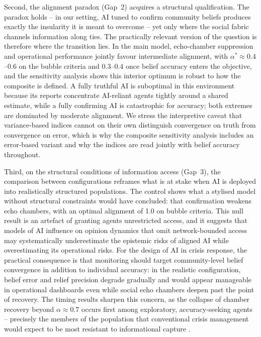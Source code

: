 \documentclass[pdflatex,sn-basic]{sn-jnl}
\begin{document}
Second, the alignment paradox (Gap~2) \citep{west2025alignment} acquires a structural qualification. The paradox holds -- in our setting, AI tuned to confirm community beliefs produces exactly the insularity it is meant to overcome -- yet only where the social fabric channels information along ties. The practically relevant version of the question is therefore where the transition lies. In the main model, echo-chamber suppression and operational performance jointly favour intermediate alignment, with $\alpha^{*} \approx 0.4$--$0.6$ on the bubble criteria and 0.3--0.4 once belief accuracy enters the objective, and the sensitivity analysis shows this interior optimum is robust to how the composite is defined. A fully truthful AI is suboptimal in this environment because its reports concentrate AI-reliant agents tightly around a shared estimate, while a fully confirming AI is catastrophic for accuracy; both extremes are dominated by moderate alignment. We stress the interpretive caveat that variance-based indices cannot on their own distinguish convergence on truth from convergence on error, which is why the composite sensitivity analysis includes an error-based variant and why the indices are read jointly with belief accuracy throughout.

Third, on the structural conditions of information access (Gap~3), the comparison between configurations reframes what is at stake when AI is deployed into realistically structured populations. The control shows what a stylised model without structural constraints would have concluded: that confirmation weakens echo chambers, with an optimal alignment of 1.0 on bubble criteria. This null result is an artefact of granting agents unrestricted access, and it suggests that models of AI influence on opinion dynamics that omit network-bounded access may systematically underestimate the epistemic risks of aligned AI while overestimating its operational risks. For the design of AI in crisis response, the practical consequence is that monitoring should target community-level belief convergence in addition to individual accuracy: in the realistic configuration, belief error and relief precision degrade gradually and would appear manageable in operational dashboards even while social echo chambers deepen past the point of recovery. The timing results sharpen this concern, as the collapse of chamber recovery beyond $\alpha \approx 0.7$ occurs first among exploratory, accuracy-seeking agents -- precisely the members of the population that conventional crisis management would expect to be most resistant to informational capture \citep{comes2020coordination}.
\end{document}
